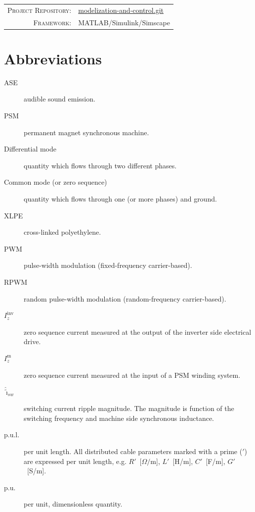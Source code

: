 \documentclass[11pt,a4paper,oneside]{book}
\newcommand{\MetaLabelA}{Project Repository}
\newcommand{\MetaValueA}{https://github.com/pwr-control/modelization-and-control.git}
\newcommand{\MetaValueAUrl}{https://github.com/pwr-control/modelization-and-control.git}
\newcommand{\MetaValueALabel}{modelization-and-control.git}
\newcommand{\MetaLabelB}{Framework}
\newcommand{\MetaValueB}{MATLAB/Simulink/Simscape}
\newcommand{\MetaLabelC}{Architecture}
\newcommand{\MetaValueC}{SiC, EiceDRIVER, Customized Power Supplies}
\begin{document}
	\vfill
	
	\noindent
	\begin{tabular}{@{} r @{\quad} l @{}}
		\textsc{\MetaLabelA:} & {\href{\MetaValueAUrl}{\MetaValueALabel}} \\[3pt]
		\textsc{\MetaLabelB:} & {\MetaValueB}       \\[3pt]
	\end{tabular}
	
	\newpage
	\setcounter{page}{1}
	\tableofcontents
	\listoffigures	
	\listoftables
	\newpage
	

\section*{Abbreviations}
\begin{description}
	\item[ASE] audible sound emission.
	\item[PSM] permanent magnet synchronous machine.
	\item[Differential mode] quantity which flows through two different phases.
	\item[Common mode (or zero sequence)] quantity which flows through one (or more phases) and ground.
	\item[XLPE] cross-linked polyethylene.	
	\item[PWM] pulse-width modulation (fixed-frequency carrier-based).
	\item[RPWM] random pulse-width modulation (random-frequency carrier-based).
	\item[$I_z^{\mathrm{inv}}$] zero sequence current measured at the output of the inverter side electrical drive.
	\item[$I_z^{\mathrm{m}}$] zero sequence current measured at the input of a PSM winding system.
	\item[$\hat{\tilde\imath}_{sw}$] switching current ripple magnitude. The magnitude is function of the switching frequency and machine side synchronous inductance. 
	\item[p.u.l.] per unit length. All distributed cable parameters marked
	with a prime ($'$) are expressed per unit length, e.g.
	$R'$~[$\Omega/\mathrm{m}$], $L'$~[H/m], $C'$~[F/m], $G'$~[S/m].
	\item[p.u.] per unit, dimensionless quantity.
\end{description}
\end{document}
